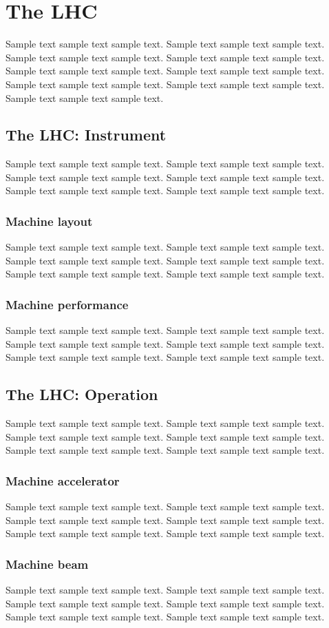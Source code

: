 \chapter{The LHC}

\label{ch:lhc}

Sample text sample text sample text. Sample text sample text sample text.
Sample text sample text sample text. Sample text sample text sample text.
Sample text sample text sample text. Sample text sample text sample text.
Sample text sample text sample text. Sample text sample text sample text.
Sample text sample text sample text.

\section{The LHC: Instrument}
Sample text sample text sample text. Sample text sample text sample text.
Sample text sample text sample text. Sample text sample text sample text.
Sample text sample text sample text. Sample text sample text sample text.

\subsection{Machine layout}
Sample text sample text sample text. Sample text sample text sample text.
Sample text sample text sample text. Sample text sample text sample text.
Sample text sample text sample text. Sample text sample text sample text.

\subsection{Machine performance}
Sample text sample text sample text. Sample text sample text sample text.
Sample text sample text sample text. Sample text sample text sample text.
Sample text sample text sample text. Sample text sample text sample text.

\section{The LHC: Operation}
Sample text sample text sample text. Sample text sample text sample text.
Sample text sample text sample text. Sample text sample text sample text.
Sample text sample text sample text. Sample text sample text sample text.

\subsection{Machine accelerator}
Sample text sample text sample text. Sample text sample text sample text.
Sample text sample text sample text. Sample text sample text sample text.
Sample text sample text sample text. Sample text sample text sample text.

\subsection{Machine beam}
Sample text sample text sample text. Sample text sample text sample text.
Sample text sample text sample text. Sample text sample text sample text.
Sample text sample text sample text. Sample text sample text sample text.
